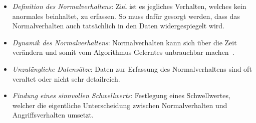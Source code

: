                 \begin{itemize}
                    \item \textit{Definition des Normalverhaltens}:
                        Ziel ist es jegliches Verhalten, welches kein anormales beinhaltet, zu erfassen.
                        So muss dafür gesorgt werden,
                        dass das Normalverhalten auch tatsächlich in den Daten widergespiegelt wird. 

                    \item \textit{Dynamik des Normalverhaltens}:
                        Normalverhalten kann sich über die Zeit verändern 
                        und somit vom Algorithmus Gelerntes unbrauchbar machen~\cite{ANOMALYSURVEY}.

                    \item \textit{Unzulängliche Datensätze}:
                        Daten zur Erfassung des Normalverhaltens sind oft veraltet oder nicht sehr detailreich. 

                    \item \textit{Findung eines sinnvollen Schwellwerts}:
                        Festlegung eines Schwellwertes,
                        welcher die eigentliche Unterscheidung zwischen Normalverhalten und Angriffsverhalten umsetzt.
                \end{itemize}


